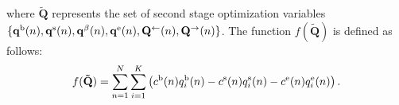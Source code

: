 \documentclass[10pt, letter,twocolumn]{IEEEtran}
\begin{document}
\noindent where $\mathbf{\tilde{Q}}$ represents the set of second stage optimization variables $\{\mathbf{q}^{\text{b}}(n), \mathbf{q}^{\text{s}}(n), \mathbf{q}^{\beta}(n), \mathbf{q}^{\text{e}}(n), \\ \mathbf{Q}^{\leftarrow}(n), \mathbf{Q}^{\rightarrow}(n)  \}$.%
The function $f(\mathbf{\tilde{Q}})$ is defined as follows:
\begin{equation}
\small
f(\mathbf{\tilde{Q}}) = \sum \limits_{n=1}^{N} \sum \limits_{i=1}^{K} \left(  c^{\text{b}}(n) q_{i}^{\text{b}}(n) - c^{\text{s}}(n) q_{i}^{\text{s}}(n) - c^{\text{e}}(n) q_{i}^{\text{e}}(n)  \right).
\end{equation}
%
\end{document}
